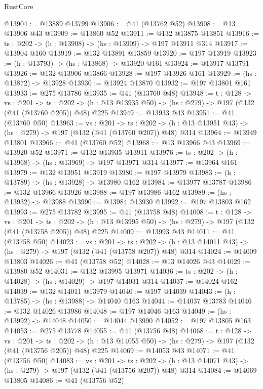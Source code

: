 \begin{lexlean}{RustCore}
\begin{coremodule}
@13904 := @13889 @13799
@13906 := @41 (@13762 @52)
@13908 := @13 @13906 @43
@13909 := @13860 @52
@13911 := @132 @13875 @13851
@13916 := {ts : @202} -> (h : @13908) -> (hs : @13909) -> @197 @13911 @314
@13917 := @13904 @160
@13919 := @132 @13891 @13859
@13920 := @197 @13919
@13923 := (h : @13793) -> (hs : @13868) -> @13920 @161
@13924 := @13917 @13791
@13926 := @132 @13906 @13866
@13928 := @197 @13926 @161
@13929 := (hs : @13872) -> @13928
@13930 := @13924 @13870
@13932 := @197 @13801 @161
@13933 := @275 @13786
@13935 := @41 (@13760 @48)
@13948 := {t : @128} ->
  {vs : @201} ->
  {ts : @202} -> (h : @13 @13935 @50) -> (hs : @279) -> @197 (@132 (@41 (@13760 @205)) @48) @225
@13949 := @13933 @43
@13951 := @41 (@13760 @50)
@13963 := {vs : @201} ->
  {ts : @202} -> (h : @13 @13951 @43) -> (hs : @279) -> @197 (@132 (@41 (@13760 @207)) @48) @314
@13964 := @13949 @13801
@13966 := @41 (@13760 @52)
@13968 := @13 @13966 @43
@13969 := @13920 @52
@13971 := @132 @13935 @13911
@13976 := {ts : @202} -> (h : @13968) -> (hs : @13969) -> @197 @13971 @314
@13977 := @13964 @161
@13979 := @132 @13951 @13919
@13980 := @197 @13979
@13983 := (h : @13789) -> (hs : @13928) -> @13980 @162
@13984 := @13977 @13787
@13986 := @132 @13966 @13926
@13988 := @197 @13986 @162
@13989 := (hs : @13932) -> @13988
@13990 := @13984 @13930
@13992 := @197 @13803 @162
@13993 := @275 @13782
@13995 := @41 (@13758 @48)
@14008 := {t : @128} ->
  {vs : @201} ->
  {ts : @202} -> (h : @13 @13995 @50) -> (hs : @279) -> @197 (@132 (@41 (@13758 @205)) @48) @225
@14009 := @13993 @43
@14011 := @41 (@13758 @50)
@14023 := {vs : @201} ->
  {ts : @202} -> (h : @13 @14011 @43) -> (hs : @279) -> @197 (@132 (@41 (@13758 @207)) @48) @314
@14024 := @14009 @13803
@14026 := @41 (@13758 @52)
@14028 := @13 @14026 @43
@14029 := @13980 @52
@14031 := @132 @13995 @13971
@14036 := {ts : @202} -> (h : @14028) -> (hs : @14029) -> @197 @14031 @314
@14037 := @14024 @162
@14039 := @132 @14011 @13979
@14040 := @197 @14039
@14043 := (h : @13785) -> (hs : @13988) -> @14040 @163
@14044 := @14037 @13783
@14046 := @132 @14026 @13986
@14048 := @197 @14046 @163
@14049 := (hs : @13992) -> @14048
@14050 := @14044 @13990
@14052 := @197 @13805 @163
@14053 := @275 @13778
@14055 := @41 (@13756 @48)
@14068 := {t : @128} ->
  {vs : @201} ->
  {ts : @202} -> (h : @13 @14055 @50) -> (hs : @279) -> @197 (@132 (@41 (@13756 @205)) @48) @225
@14069 := @14053 @43
@14071 := @41 (@13756 @50)
@14083 := {vs : @201} ->
  {ts : @202} -> (h : @13 @14071 @43) -> (hs : @279) -> @197 (@132 (@41 (@13756 @207)) @48) @314
@14084 := @14069 @13805
@14086 := @41 (@13756 @52)

\end{coremodule}
\end{lexlean}
